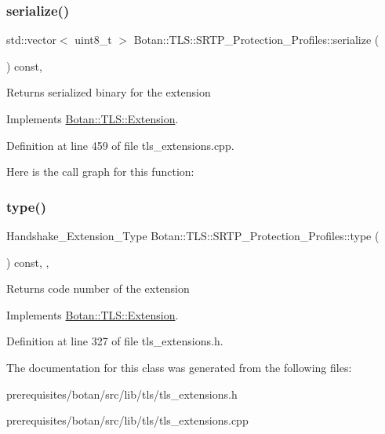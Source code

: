\subsubsection{\texorpdfstring{serialize()}{serialize()}}
{\footnotesize\ttfamily std\+::vector$<$ uint8\+\_\+t $>$ Botan\+::\+T\+L\+S\+::\+S\+R\+T\+P\+\_\+\+Protection\+\_\+\+Profiles\+::serialize (\begin{DoxyParamCaption}{ }\end{DoxyParamCaption}) const\hspace{0.3cm}{\ttfamily [override]}, {\ttfamily [virtual]}}

\begin{DoxyReturn}{Returns}
serialized binary for the extension 
\end{DoxyReturn}


Implements \mbox{\hyperlink{class_botan_1_1_t_l_s_1_1_extension_a56788726ad2526db54e5a26039cb69db}{Botan\+::\+T\+L\+S\+::\+Extension}}.



Definition at line 459 of file tls\+\_\+extensions.\+cpp.

Here is the call graph for this function\+:
\mbox{\label{class_botan_1_1_t_l_s_1_1_s_r_t_p___protection___profiles_a7d0e938631996e86ceab9f94092f9119}} 
\subsubsection{\texorpdfstring{type()}{type()}}
{\footnotesize\ttfamily Handshake\+\_\+\+Extension\+\_\+\+Type Botan\+::\+T\+L\+S\+::\+S\+R\+T\+P\+\_\+\+Protection\+\_\+\+Profiles\+::type (\begin{DoxyParamCaption}{ }\end{DoxyParamCaption}) const\hspace{0.3cm}{\ttfamily [inline]}, {\ttfamily [override]}, {\ttfamily [virtual]}}

\begin{DoxyReturn}{Returns}
code number of the extension 
\end{DoxyReturn}


Implements \mbox{\hyperlink{class_botan_1_1_t_l_s_1_1_extension_ac8819b312ce604453225e7b4f7c373ec}{Botan\+::\+T\+L\+S\+::\+Extension}}.



Definition at line 327 of file tls\+\_\+extensions.\+h.



The documentation for this class was generated from the following files\+:\begin{DoxyCompactItemize}
\item 
prerequisites/botan/src/lib/tls/tls\+\_\+extensions.\+h\item 
prerequisites/botan/src/lib/tls/tls\+\_\+extensions.\+cpp\end{DoxyCompactItemize}
